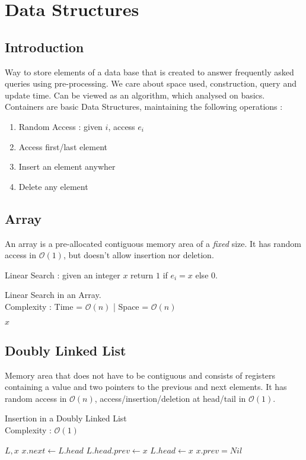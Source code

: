 \documentclass{cours}
\begin{document}
\section{Data Structures}
\subsection{Introduction}
Way to store elements of a data base that is created to answer frequently asked queries using pre-processing.
We care about space used, construction, query and update time.
Can be viewed as an algorithm, which analysed on basics.
Containers are basic Data Structures, maintaining the following operations :
\begin{enumerate}
    \item Random Access : given $i$, access $e_{i}$
    \item Access first/last element
    \item Insert an element anywher
    \item Delete any element
\end{enumerate}

\subsection{Array}
An array is a pre-allocated contiguous memory area of a \emph{fixed} size. It has random access in $\mathcal{O}(1)$, but doesn't allow insertion nor deletion.

Linear Search : given an integer $x$ return $1$ if $e_{i} = x$ else 0.
\begin{algorithm}
    \caption{Linear Search in an Array. \\ Complexity : Time = $\mathcal{O}(n)$ | Space = $\mathcal{O}(n)$}
    \begin{algorithmic}
        \Input
        $x$
        \EndInput
    \end{algorithmic}
\end{algorithm}

\subsection{Doubly Linked List}
Memory area that does not have to be contiguous and consists of registers containing a value and two pointers to the previous and next elements.
It has random access in $\mathcal{O}(n)$, access/insertion/deletion at head/tail in $\mathcal{O}(1)$.
\begin{algorithm}
    \caption{Insertion in a Doubly Linked List \\ Complexity : $\mathcal{O}(1)$}
    \begin{algorithmic}
        \Input
        $ L, x$
        \EndInput
        \State $x.next \gets L.head$
        \State $L.head.prev \gets x$
        \EndIf
        \State $L.head \gets x$
        \State $x.prev = Nil$
    \end{algorithmic}
\end{algorithm}
\end{document}
